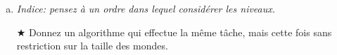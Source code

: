 \documentclass{article}
\newcommand{\avance}{{\large$\bigstar$}}         %
\newcommand{\avancepts}{{\scriptsize$\bigstar$}} %
\begin{document}
\begin{question}
\begin{enumerate}[(a)]
\begin{enumerate}[(i)]
    \end{enumerate}
    
  \item {}\smallskip
    
    \hfill\emph{Indice: pensez à un ordre dans lequel considérer les
      niveaux.}\bigskip

  \item[\avance{}] Donnez \marginpar{\avancepts{} \addbonus{2.5}} un
    algorithme qui effectue la même tâche, mais cette fois sans
    restriction sur la taille des mondes.
    
  \end{enumerate}
\end{question}
\end{document}
